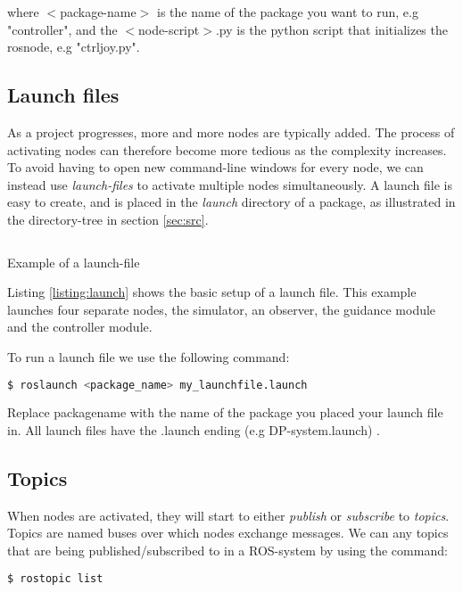 where $<$package-name$>$ is the name of the package you want to run, e.g "controller", and the $<$node-script$>$.py is the python script that initializes the rosnode, e.g "ctrl\textunderscore joy.py".

\subsection{Launch files}

As a project progresses, more and more nodes are typically added. The process of activating nodes can therefore become more tedious as the complexity increases. To avoid having to open new command-line windows for every node, we can instead use \textit{launch-files} to activate multiple nodes simultaneously. A launch file is easy to create, and is placed in the \textit{launch} directory of a package, as illustrated in the directory-tree in section \ref{sec:src}.

\begin{listing}[h]
\inputminted{octave}{Code/example.launch}
\caption{Example of a launch-file}
\label{listing:launch}
\end{listing}

Listing \ref{listing:launch} shows the basic setup of a launch file. This example launches four separate nodes, the simulator, an observer, the guidance module and the controller module. 

To run a launch file we use the following command: 

\begin{lstlisting}[language=bash]
$ roslaunch <package_name> my_launchfile.launch  
\end{lstlisting} 

Replace package\textunderscore name with the name of the package you placed your launch file in. All launch files have the .launch ending (e.g DP-system.launch) . 

\subsection{Topics}

When nodes are activated, they will start to either \textit{publish} or \textit{subscribe} to \textit{topics}. Topics are named buses over which nodes exchange messages. We can any topics that are being published/subscribed to in a ROS-system by using the command: 

\begin{lstlisting}[language=bash]
$ rostopic list 
\end{lstlisting} 

